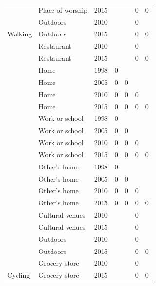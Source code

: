 \documentclass[preprint, 3p,
authoryear]{elsarticle} %
\begin{document}
\begin{table}
{\begin{tabular}[t]{lllrrrr}
 & Place of worship & 2015 &  &  & 0 & 0\\

 & Outdoors & 2010 &  &  & 0 & \\

\multirow[t]{-22}{*}{\raggedright\arraybackslash Walking} & Outdoors & 2015 &  &  & 0 & 0\\
\cmidrule{1-7}
 & Restaurant & 2010 &  &  & 0 & \\

 & Restaurant & 2015 &  &  & 0 & 0\\

 & Home & 1998 & 0 &  &  & \\

 & Home & 2005 & 0 & 0 &  & \\

 & Home & 2010 & 0 & 0 & 0 & \\

 & Home & 2015 & 0 & 0 & 0 & 0\\

 & Work or school & 1998 & 0 &  &  & \\

 & Work or school & 2005 & 0 & 0 &  & \\

 & Work or school & 2010 & 0 & 0 & 0 & \\

 & Work or school & 2015 & 0 & 0 & 0 & 0\\

 & Other's home & 1998 & 0 &  &  & \\

 & Other's home & 2005 & 0 & 0 &  & \\

 & Other's home & 2010 & 0 & 0 & 0 & \\

 & Other's home & 2015 & 0 & 0 & 0 & 0\\

 & Cultural venues & 2010 &  &  & 0 & \\

 & Cultural venues & 2015 &  &  & 0 & \\

 & Outdoors & 2010 &  &  & 0 & \\

 & Outdoors & 2015 &  &  & 0 & 0\\

 & Grocery store & 2010 &  &  & 0 & \\

\multirow[t]{-20}{*}{\raggedright\arraybackslash Cycling} & Grocery store & 2015 &  &  & 0 & 0\\
\bottomrule
\end{tabular}}
\end{table}
\end{document}
